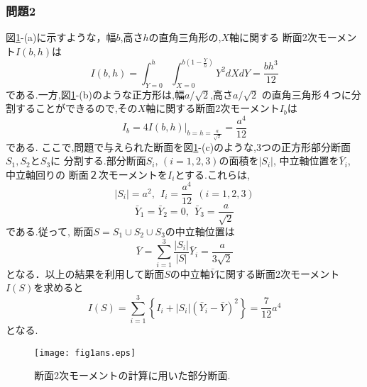 \documentclass[10pt,a4j]{jarticle}
\begin{document}
\subsubsection*{問題2}
図\ref{fig:fig1}-(a)に示すような，幅$b$,高さ$h$の直角三角形の,$X$軸に関する
断面2次モーメント$I(b,h)$は
\begin{equation}
	I(b,h)=\int_{Y=0}^h\int_{X=0}^{b\left(1-\frac{Y}{h}\right)}Y^2dXdY= \frac{bh^3}{12}
	\label{eqn:Ibh}
\end{equation}
である.一方,図\ref{fig:fig1}-(b)のような正方形は,幅$a/\sqrt{2}$,高さ$a/\sqrt{2}$
の直角三角形４つに分割することができるので,その$X$軸に関する断面2次モーメント$I_b$は
\begin{equation}
	I_b
	=
	4 \left. I(b,h) \right|
	_{b=h=\frac{a}{\sqrt{2}}}
	=\frac{a^4}{12}
\end{equation}
である.
ここで,問題で与えられた断面を図\ref{fig:fig1}-(c)のような,3つの正方形部分断面$S_1, S_2$と$S_3$に
分割する.部分断面$S_i,\,(i=1,2,3)$の面積を$\left|S_i\right|$, 中立軸位置を$\bar Y_i$, 中立軸回りの
断面２次モーメントを$I_i$とする.これらは,
\begin{equation}
	\left| S_i\right|=a^2, \ \ I_i=\frac{a^4}{12} \ \ (i=1,2,3) 
\end{equation}
\begin{equation}
	\bar Y_1=\bar Y_2=0, \ \ \bar Y_3=\frac{a}{\sqrt{2}}
\end{equation}
である.従って, 断面$S=S_1\cup S_2 \cup S_3$の中立軸位置は
\begin{equation}
	\bar Y=\sum _{i=1}^3 \frac{\left|S_i\right|}{\left|S\right|}\bar Y_i =\frac{a}{3\sqrt{2}}
\end{equation}
となる．以上の結果を利用して断面$S$の中立軸$\bar Y$に関する断面2次モーメント$I(S)$を求めると
\begin{equation}
	I(S)=\sum_{i=1}^3 \left \{ I_i + \left|S_i\right|\left(\bar Y_i-\bar Y\right)^2 \right\} =\frac{7}{12}a^4
\end{equation}
となる.
\begin{figure}[h]
	\begin{center}
	\texttt{[image: fig1ans.eps]} 
	\end{center}
	\caption{断面2次モーメントの計算に用いた部分断面.} 
	\label{fig:fig1}
\end{figure}
\end{document}

